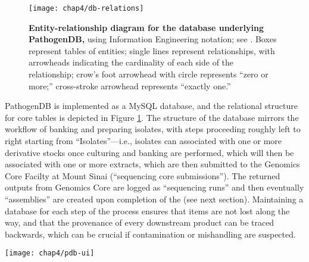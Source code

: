 \begin{figure}[htb]
  \texttt{[image: chap4/db-relations]}               
  \caption[Entity-relationship diagram for the database underlying PathogenDB]{\textbf{Entity-relationship diagram for the database underlying PathogenDB,} using Information Engineering notation; see \textcite{Halpin2010}. Boxes represent tables of entities; single lines represent relationships, with arrowheads indicating the cardinality of each side of the relationship; crow’s foot arrowhead with circle represents “zero or more;” cross-stroke arrowhead represents “exactly one.”}
  \label{fig:pdb_relations}
\end{figure}

PathogenDB is implemented as a MySQL database, and the relational structure for core tables is depicted in Figure \ref{fig:pdb_relations}. The structure of the database mirrors the workflow of banking and preparing isolates, with steps proceeding roughly left to right starting from ``Isolates''—i.e., isolates can associated with one or more derivative stocks once culturing and banking are performed, which will then be associated with one or more extracts, which are then submitted to the Genomics Core Facilty at Mount Sinai (``sequencing core submissions''). The returned outputs from Genomics Core are logged as ``sequencing runs'' and then eventually ``assemblies'' are created upon completion of the \pathogendbpipeline (see next section). Maintaining a database for each step of the process ensures that items are not lost along the way, and that the provenance of every downstream product can be traced backwards, which can be crucial if contamination or mishandling are suspected.

\begin{sidewaysfigure}[hp]
  \sidewaysvspace
  \centering
  \texttt{[image: chap4/pdb-ui]}               
\end{sidewaysfigure}

